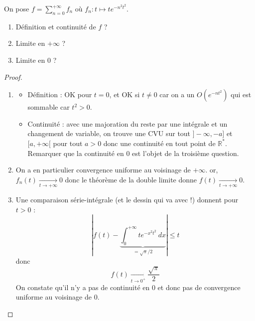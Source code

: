 \documentclass[french,a4paper]{article}
\newcommand{\R}{\mathbb{R}}
\newcommand{\st}{^*}
\theoremstyle{plain}
\theoremstyle{definition}
\theoremstyle{remark}
\begin{document}
\begin{ex}{}
	On pose $\displaystyle f=\sum_{n=0}^{+\infty}f_n$ où $f_n:t\mapsto te^{-n^2t^2}$.
	\begin{enumerate}
		\item Définition et continuité de $f$ ?
		\item Limite en $+\infty$ ?
		\item Limite en $0$ ?
	\end{enumerate}
\end{ex}
\begin{proof}
	\begin{enumerate}
		\item \begin{itemize}
			\item Définition : OK pour $t=0$, et OK si $t\ne 0$ car on a un $O(e^{-nt^2})$ qui est sommable car $t^2>0$.
			\item Continuité : avec une majoration du reste par une intégrale et un changement de variable, on trouve une CVU sur tout $]-\infty,-a]$ et $[a,+\infty[$ pour tout $a>0$ donc une continuité en tout point de $\R\st$. Remarquer que la continuité en $0$ est l'objet de la troisième question.
		\end{itemize}
		\item On a en particulier convergence uniforme au voisinage de $+\infty$. or, $f_n(t)\xrightarrow[t\to+\infty]{}0$ donc le théorème de la double limite donne $f(t)\xrightarrow[t\to+\infty]{}0$.
		\item Une comparaison série-intégrale (et le dessin qui va avec !) donnent pour $t>0$ : $$\left\lvert f(t)-\underbrace{\int_{0}^{+\infty}te^{-x^2t^2}\ dx}_{=\sqrt{\pi}/2} \right\rvert\leqslant t$$ donc $$f(t)\xrightarrow[t\to0^+]{}\frac{\sqrt{\pi}}{2}$$ On constate qu'il n'y a pas de continuité en $0$ et donc pas de convergence uniforme au voisinage de $0$.
	\end{enumerate}
\end{proof}
\end{document}
